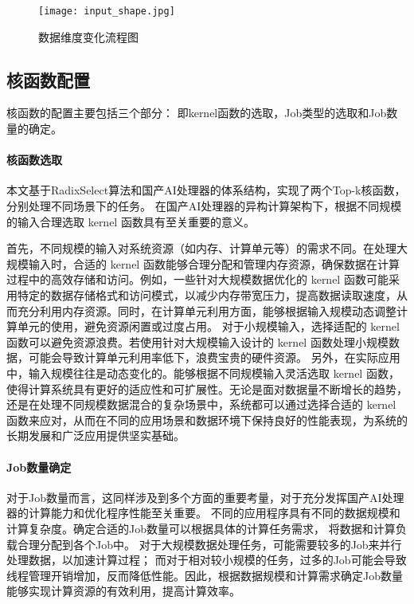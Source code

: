     \begin{figure}[ht]
        \centering
        \texttt{[image: input\_shape.jpg]}
        \caption{数据维度变化流程图}
        \label{fig:input_shape}
    \end{figure}
    
    
    \subsection{核函数配置}
    核函数的配置主要包括三个部分：
    即kernel函数的选取，Job类型的选取和Job数量的确定。
        \paragraph{核函数选取}
        本文基于RadixSelect算法和国产AI处理器的体系结构，实现了两个Top-k核函数，分别处理不同场景下的任务。
        在国产AI处理器的异构计算架构下，根据不同规模的输入合理选取 kernel 函数具有至关重要的意义。

        首先，不同规模的输入对系统资源（如内存、计算单元等）的需求不同。在处理大规模输入时，合适的 kernel 函数能够合理分配和管理内存资源，确保数据在计算过程中的高效存储和访问。例如，一些针对大规模数据优化的 kernel 函数可能采用特定的数据存储格式和访问模式，以减少内存带宽压力，提高数据读取速度，从而充分利用内存资源。同时，在计算单元利用方面，能够根据输入规模动态调整计算单元的使用，避免资源闲置或过度占用。
        对于小规模输入，选择适配的 kernel 函数可以避免资源浪费。若使用针对大规模输入设计的 kernel 函数处理小规模数据，可能会导致计算单元利用率低下，浪费宝贵的硬件资源。
        另外，在实际应用中，输入规模往往是动态变化的。能够根据不同规模输入灵活选取 kernel 函数，使得计算系统具有更好的适应性和可扩展性。无论是面对数据量不断增长的趋势，还是在处理不同规模数据混合的复杂场景中，系统都可以通过选择合适的 kernel 函数来应对，从而在不同的应用场景和数据环境下保持良好的性能表现，为系统的长期发展和广泛应用提供坚实基础。




        
        
        \paragraph{Job数量确定}
        对于Job数量而言，这同样涉及到多个方面的重要考量，对于充分发挥国产AI处理器的计算能力和优化程序性能至关重要。
        不同的应用程序具有不同的数据规模和计算复杂度。确定合适的Job数量可以根据具体的计算任务需求，
        将数据和计算负载合理分配到各个Job中。
        对于大规模数据处理任务，可能需要较多的Job来并行处理数据，以加速计算过程；
        而对于相对较小规模的任务，过多的Job可能会导致线程管理开销增加，反而降低性能。因此，根据数据规模和计算需求确定Job数量能够实现计算资源的有效利用，提高计算效率。


